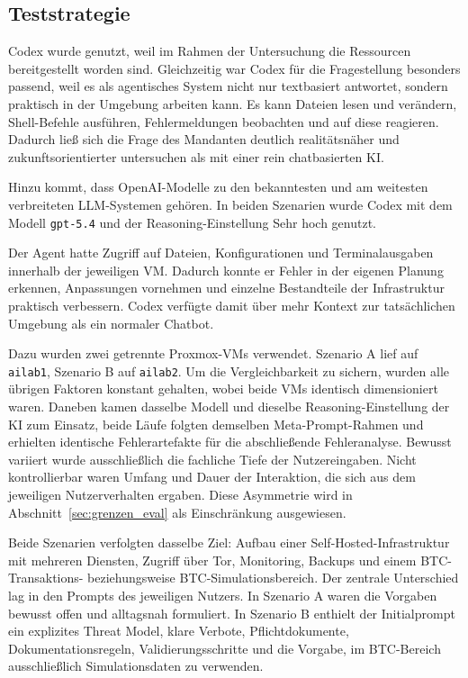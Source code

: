 \subsection{Teststrategie} \label{sec:teststrategie}

Codex wurde genutzt, weil im Rahmen der Untersuchung die Ressourcen bereitgestellt worden sind. Gleichzeitig war Codex für die Fragestellung besonders passend, weil es als agentisches System nicht nur textbasiert antwortet, sondern praktisch in der Umgebung arbeiten kann. Es kann Dateien lesen und verändern, Shell-Befehle ausführen, Fehlermeldungen beobachten und auf diese reagieren. Dadurch ließ sich die Frage des Mandanten deutlich realitätsnäher und zukunftsorientierter untersuchen als mit einer rein chatbasierten \ac{KI}.

Hinzu kommt, dass OpenAI-Modelle zu den bekanntesten und am weitesten verbreiteten \ac{LLM}-Systemen gehören. In beiden Szenarien wurde Codex mit dem Modell \texttt{gpt-5.4} und der Reasoning-Einstellung \glqq Sehr hoch\grqq{} genutzt.

Der Agent hatte Zugriff auf Dateien, Konfigurationen und Terminalausgaben innerhalb der jeweiligen \acs{VM}. Dadurch konnte er Fehler in der eigenen Planung erkennen, Anpassungen vornehmen und einzelne Bestandteile der Infrastruktur praktisch verbessern. Codex verfügte damit über mehr Kontext zur tatsächlichen Umgebung als ein normaler Chatbot.

Dazu wurden zwei getrennte Proxmox-\acs{VM}s verwendet. Szenario A lief auf \texttt{ailab1}, Szenario B auf \texttt{ailab2}.
Um die Vergleichbarkeit zu sichern, wurden alle übrigen Faktoren konstant gehalten, wobei beide \acp{VM} identisch dimensioniert waren. Daneben kamen dasselbe Modell und dieselbe Reasoning-Einstellung der \ac{KI} zum Einsatz, beide Läufe folgten demselben Meta-Prompt-Rahmen und erhielten identische Fehlerartefakte für die abschließende Fehleranalyse. 
Bewusst variiert wurde ausschließlich die fachliche Tiefe der Nutzereingaben. Nicht kontrollierbar waren Umfang und Dauer der Interaktion, die sich aus dem jeweiligen Nutzerverhalten ergaben.
Diese Asymmetrie wird in Abschnitt~\ref{sec:grenzen_eval} als Einschränkung
ausgewiesen.

Beide Szenarien verfolgten dasselbe Ziel: Aufbau einer Self-Hosted-Infrastruktur mit mehreren Diensten, Zugriff über Tor, Monitoring, Backups und einem \ac{BTC}-Transaktions- beziehungsweise \ac{BTC}-Simulationsbereich. Der zentrale Unterschied lag in den Prompts des jeweiligen Nutzers. In Szenario A waren die Vorgaben bewusst offen und alltagsnah formuliert. In Szenario B enthielt der Initialprompt ein explizites Threat Model, klare Verbote, Pflichtdokumente, Dokumentationsregeln, Validierungsschritte und die Vorgabe, im \ac{BTC}-Bereich ausschließlich Simulationsdaten zu verwenden.


